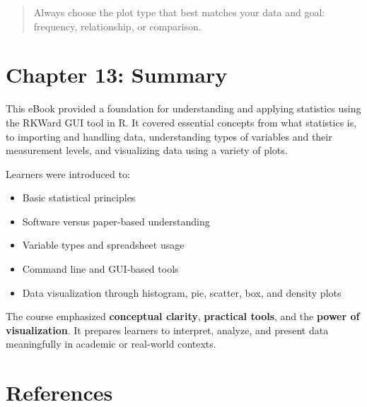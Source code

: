 \documentclass[
  letterpaper,
  DIV=11,
  numbers=noendperiod]{scrreprt}
\providecommand{\tightlist}{%
  \setlength{\itemsep}{0pt}\setlength{\parskip}{0pt}}
\begin{document}
\begin{quote}
Always choose the plot type that best matches your data and goal:
frequency, relationship, or comparison.
\end{quote}


\chapter{Chapter 13: Summary}\label{chapter-13-summary}

This eBook provided a foundation for understanding and applying
statistics using the RKWard GUI tool in R. It covered essential concepts
from what statistics is, to importing and handling data, understanding
types of variables and their measurement levels, and visualizing data
using a variety of plots.

Learners were introduced to:

\begin{itemize}
\tightlist
\item
  Basic statistical principles\\
\item
  Software versus paper-based understanding\\
\item
  Variable types and spreadsheet usage\\
\item
  Command line and GUI-based tools\\
\item
  Data visualization through histogram, pie, scatter, box, and density
  plots
\end{itemize}

The course emphasized \textbf{conceptual clarity}, \textbf{practical
tools}, and the \textbf{power of visualization}. It prepares learners to
interpret, analyze, and present data meaningfully in academic or
real-world contexts.


\chapter{References}\label{references}
\end{document}
